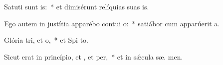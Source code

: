 \item Satuti sunt is:~* et dimisérunt relíquias suas  is.
\item Ego autem in justítia apparébo contui o:~* satiábor cum apparúerit  a.
\item Glória tri, et o,~* et Spi to.
\item Sicut erat in princípio, et , et per,~* et in sǽcula sæ. men.
